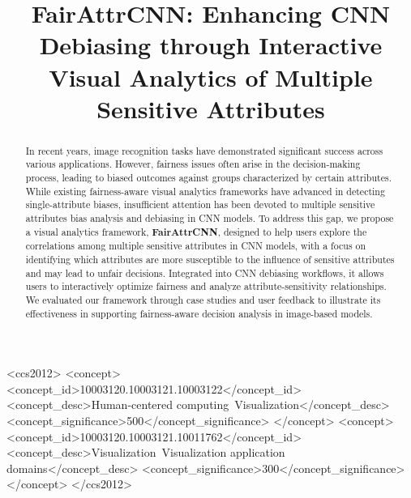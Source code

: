 \documentclass[sigconf]{acmart}
\newcommand{\REVISE}[1]{#1}
\begin{document}
\title{FairAttrCNN: Enhancing CNN Debiasing through Interactive Visual Analytics of Multiple Sensitive Attributes}


\begin{abstract}
  In recent years, image recognition tasks have demonstrated significant success across various applications. However, fairness issues often arise in the decision-making process, leading to biased outcomes against groups characterized by certain attributes. \REVISE{While existing fairness-aware visual analytics frameworks have advanced in detecting single-attribute biases, insufficient attention has been devoted to multiple sensitive attributes bias analysis and debiasing in CNN models.} To address this gap, we propose a visual analytics framework, \textbf{FairAttrCNN}, designed to help users explore the correlations among multiple sensitive attributes in CNN models, with a focus on identifying which attributes are more susceptible to the influence of sensitive attributes and may lead to unfair decisions. Integrated into CNN debiasing workflows, it allows users to interactively optimize fairness and analyze attribute-sensitivity relationships. We evaluated our framework through case studies and user feedback to illustrate its effectiveness in supporting fairness-aware decision analysis in image-based models.
\end{abstract}


\begin{CCSXML}
<ccs2012>
 <concept>
  <concept_id>10003120.10003121.10003122</concept_id>
  <concept_desc>Human-centered computing~Visualization</concept_desc>
  <concept_significance>500</concept_significance>
 </concept>
 <concept>
  <concept_id>10003120.10003121.10011762</concept_id>
  <concept_desc>Visualization~Visualization application domains</concept_desc>
  <concept_significance>300</concept_significance>
 </concept>
</ccs2012>
\end{CCSXML}


\end{document}
